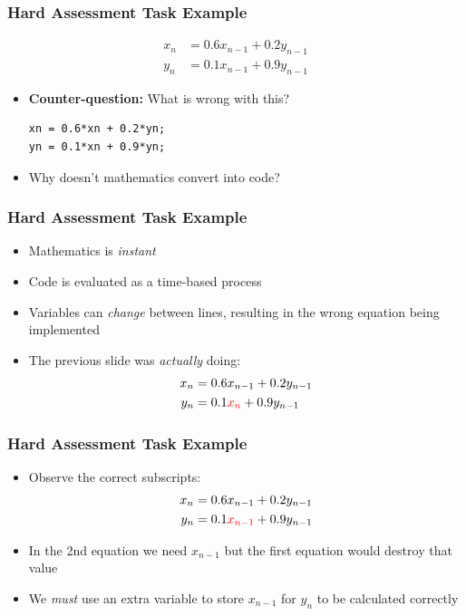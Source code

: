 \documentclass[14pt]{beamer}
\begin{document}
\begin{frame}[fragile]
\frametitle{Hard Assessment Task Example}
\vspace{-5mm}
\begin{align*}
x_n &= 0.6x_{n-1} + 0.2y_{n-1}\\
y_n &= 0.1x_{n-1} + 0.9y_{n-1}
\end{align*}
\vspace{-6mm}
\begin{itemize}
\item \textbf{Counter-question:} What is wrong with this?
\begin{lstlisting}[style=CStyle]
xn = 0.6*xn + 0.2*yn;
yn = 0.1*xn + 0.9*yn;
\end{lstlisting}
\pause
\item Why doesn't mathematics convert into code?
\end{itemize}
\end{frame}

\begin{frame}[fragile]
\frametitle{Hard Assessment Task Example}
\begin{itemize}
\item Mathematics is \textit{instant}
\pause
\item Code is evaluated as a time-based process
\pause
\item Variables can \textit{change} between lines, resulting in the wrong equation being implemented
\item The previous slide was \textit{actually} doing:
\begin{align*}
x_n &= 0.6x_{n-1} + 0.2y_{n-1}\\
y_n &= 0.1\textcolor{red}{x_{n}} + 0.9y_{n-1}
\end{align*}
\end{itemize}
\end{frame}

\begin{frame}
\frametitle{Hard Assessment Task Example}
\begin{itemize}
\item Observe the correct subscripts:
\begin{align*}
x_n &= 0.6x_{n-1} + 0.2y_{n-1}\\
y_n &= 0.1\textcolor{red}{x_{n-1}} + 0.9y_{n-1}
\end{align*}
\item In the 2nd equation we need $x_{n-1}$ but the first equation would destroy that value
\item We \textit{must} use an extra variable to store $x_{n-1}$ for $y_n$ to be calculated correctly
\end{itemize}
\end{frame}
\end{document}
